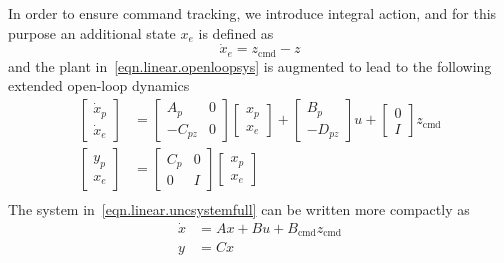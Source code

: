 In order to ensure command tracking, we introduce integral action, and for this purpose an additional state $x_e$ is defined as
\begin{equation*}
  \dot{x}_{e}=z_{\text{cmd}}-z
\end{equation*}
and the plant in~\eqref{eqn.linear.openloopsys} is augmented to lead to the following extended open-loop dynamics
\begin{equation}
  \label{eqn.linear.uncsystemfull}
  \begin{split}
    \begin{bmatrix}
      \dot{x}_{p} \\
      \dot{x}_{e}
    \end{bmatrix}
    &=
    \begin{bmatrix}
      A_{p} & 0 \\
      -C_{pz} & 0
    \end{bmatrix}
    \begin{bmatrix}
      x_{p} \\
      x_{e}
    \end{bmatrix}
    +
    \begin{bmatrix}
      B_{p} \\
      -D_{pz}
    \end{bmatrix}u
    +
    \begin{bmatrix}
      0 \\
      I
    \end{bmatrix}z_{\text{cmd}} \\
    \begin{bmatrix}
      y_{p} \\
      x_{e}
    \end{bmatrix}
    &=
    \begin{bmatrix}
      C_{p} & 0 \\
      0 & I
    \end{bmatrix}
    \begin{bmatrix}
      x_{p} \\
      x_{e}
    \end{bmatrix} \\
  \end{split}
\end{equation}
The system in~\eqref{eqn.linear.uncsystemfull} can be written more compactly as
\begin{equation}
  \label{eqn.linear.uncsystem}
  \begin{split}
    \dot{x}&=Ax+Bu+B_{\text{cmd}}z_{\text{cmd}} \\
    y&=Cx
  \end{split}
\end{equation}
